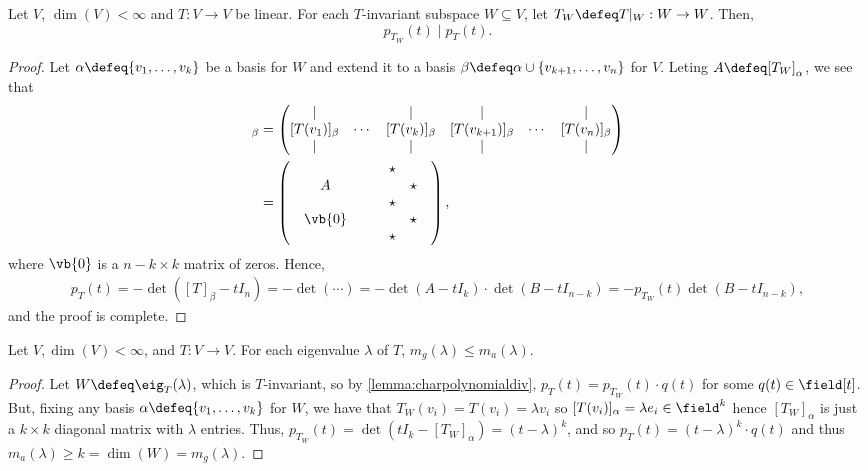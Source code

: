 \begin{lemma}\label{lemma:charpolynomialdiv}
 Let $V$, $\dim(V) < \infty$ and $T : V \to V$ be linear. For each $T$-invariant subspace $W \subseteq V$, let $T_W \defeq T\vert_W : W \to W$. Then, $$p_{T_W}(t)\mid p_T(t).$$
\end{lemma}

\begin{proof}
    Let $\alpha \defeq \{v_1, \dots, v_k\}$ be a basis for $W$ and extend it to a basis $\beta \defeq \alpha \cup \{v_{k+1}, \dots, v_n\}$ for $V$. Leting $A \defeq [T_W]_\alpha$, we see that \begin{align*}
        [T]_\beta &= \begin{pmatrix}
            \vert & & \vert & \vert & & \vert\\
            [T(v_1)]_\beta & \cdots & [T(v_k)]_\beta & [T(v_{k+1})]_\beta & \cdots  & [T(v_n)]_\beta\\
            \vert & & \vert & \vert & & \vert
        \end{pmatrix}\\
        &= \begin{pmatrix}
             & & &  &\star  & &\\
             & A &  & & & \star &  \\
             & & &  & \star &   & \\
             & \vb{0} &  & &  &\star &  \\
             &  & &  &  \star & &
        \end{pmatrix},
    \end{align*}
    where $\vb{0}$ is a $n -k \times k$ matrix of zeros. Hence, \begin{align*}
        p_T(t) = -\det([T]_\beta - tI_n) = - \det(\cdots) = -\det(A - t I_k) \cdot \det(B - t I_{n-k}) = -p_{T_W}(t) \det(B - t I_{n-k}),
    \end{align*}
    and the proof is complete.
\end{proof}

\begin{proposition}
    Let $V, \dim(V) < \infty$, and $T : V\to V$. For each eigenvalue $\lambda$ of $T$, $m_g(\lambda) \leq m_a(\lambda)$.
\end{proposition}

\begin{proof}
    Let $W \defeq \eig_T(\lambda)$, which is $T$-invariant, so by \cref{lemma:charpolynomialdiv}, $p_T(t) = p_{T_W}(t) \cdot q(t)$ for some $q(t) \in \field[t]$. But, fixing any basis $\alpha \defeq \{v_1, \dots, v_k\}$ for $W$, we have that $T_W(v_i) = T(v_i) = \lambda v_i$ so $[T(v_i)]_\alpha = \lambda e_i \in \field^k$ hence $[T_W]_\alpha$ is just a $k \times k$ diagonal matrix with $\lambda$ entries. Thus, $p_{T_W}(t) = \det(tI_k - [T_W]_\alpha) = (t-\lambda)^k$, and so $p_T(t) = (t-\lambda)^k \cdot q(t)$ and thus $m_a(\lambda) \geq k = \dim(W) = m_g(\lambda)$.
\end{proof}

